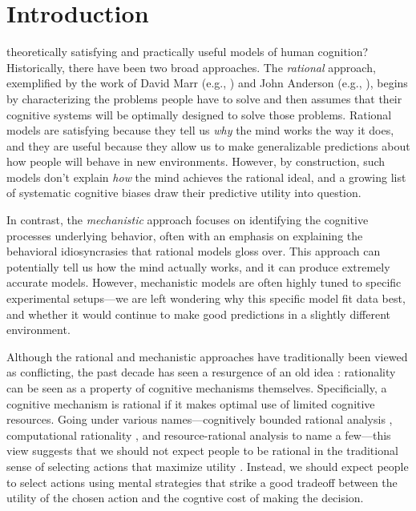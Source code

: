 \chapter{Introduction}
\label{introduction}

 theoretically satisfying and practically useful models of human cognition? Historically, there have been two broad approaches. The \emph{rational} approach, exemplified by the work of David Marr (e.g., \citeyear{marr1982vision}) and John Anderson (e.g., \citeyear{anderson1990adaptive}), begins by characterizing the problems people have to solve and then assumes that their cognitive systems will be optimally designed to solve those problems. Rational models are satisfying because they tell us \emph{why} the mind works the way it does, and they are useful because they allow us to make generalizable predictions about how people will behave in new environments. However, by construction, such models don't explain \emph{how} the mind achieves the rational ideal, and a growing list of systematic cognitive biases draw their predictive utility into question. 

In contrast, the \emph{mechanistic} approach focuses on identifying the cognitive processes underlying behavior, often with an emphasis on explaining the behavioral idiosyncrasies that rational models gloss over. This approach can potentially tell us how the mind actually works, and it can produce extremely accurate models. However, mechanistic models are often highly tuned to specific experimental setups---we are left wondering why this specific model fit data best, and whether it would continue to make good predictions in a slightly different environment.

Although the rational and mechanistic approaches have traditionally been viewed as conflicting, the past decade has seen a resurgence of an old idea \citep{simon1955behavioral}: rationality can be seen as a property of cognitive mechanisms themselves. Specificially, a cognitive mechanism is rational if it makes optimal use of limited cognitive resources. Going under various names---cognitively bounded rational analysis \citep{howes2009rational}, computational rationality \citep{lewis2014computational,gershman2015computational}, and resource-rational analysis \citep{griffiths2015rational,lieder2020} to name a few---this view suggests that we should not expect people to be rational in the traditional sense of selecting actions that maximize utility \citep{vonneumann1944theory}. Instead, we should expect people to select actions using mental strategies that strike a good tradeoff between the utility of the chosen action and the cogntive cost of making the decision.

